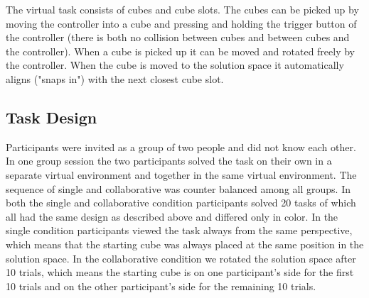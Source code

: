 \documentclass{article}
\begin{document}
The virtual task consists of cubes and cube slots. The cubes can be picked up by moving the controller into a cube and pressing and holding the trigger button of the controller (there is both no collision between cubes and between cubes and the controller). When a cube is picked up it can be moved and rotated freely by the controller. When the cube is moved to the solution space it  automatically aligns ("snaps in") with the next closest cube slot.






\subsection{Task Design}
Participants were invited as a group of two people and did not know each other. In one group session the two participants solved the task on their own in a separate virtual environment and together in the same virtual environment. The sequence of single and collaborative was counter balanced among all groups. In both the single and collaborative condition participants solved 20 tasks of which all had the same design as described above and differed only in color. In the single condition participants viewed the task always from the same perspective, which means that the starting cube was always placed at the same position in the solution space.
In the collaborative condition we rotated the solution space after 10 trials, which means the starting cube is on one participant's side for the first 10 trials and on the other participant's side for the remaining 10 trials. 
\end{document}
